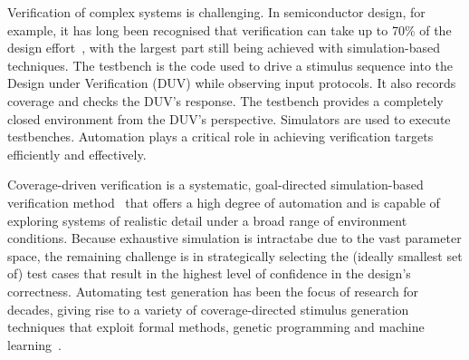 \documentclass[letterpaper, 10 pt, journal, twoside]{IEEEtran}
\begin{document}
Verification of complex systems is challenging. In semiconductor design, for
example, it has long been recognised that verification can take up to 70\% of
the design effort~\cite{arden2002international}, with the largest part still
being achieved with simulation-based techniques. 
%
The testbench is the code used to drive a stimulus sequence into the Design
under Verification (DUV) while observing input protocols. It also records
coverage and checks the DUV's response. The testbench provides a completely
closed environment from the DUV's perspective. Simulators are used to execute
testbenches. Automation plays a critical role in achieving verification targets
efficiently and effectively.

Coverage-driven verification is a systematic, goal-directed simulation-based
verification method~\cite{HVC2015} that offers a high degree of automation and
is capable of exploring systems of realistic detail under a broad range of
environment conditions.
%
Because exhaustive simulation is intractabe due to the vast parameter space,
the remaining challenge is in strategically selecting the (ideally smallest set
of) test cases that result in the highest level of confidence in the design's
correctness.
%
Automating test generation has been the focus of research for decades, giving
rise to a variety of coverage-directed stimulus generation techniques that
exploit formal methods, genetic programming and machine learning~\cite{Ioannides:2012}. 
\end{document}

